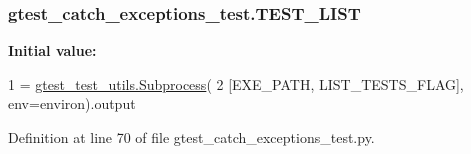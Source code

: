 \subsubsection[{\texorpdfstring{T\+E\+S\+T\+\_\+\+L\+I\+ST}{TEST_LIST}}]{\setlength{\rightskip}{0pt plus 5cm}gtest\+\_\+catch\+\_\+exceptions\+\_\+test.\+T\+E\+S\+T\+\_\+\+L\+I\+ST}\hypertarget{namespacegtest__catch__exceptions__test_ac0cf90f54624335d1765e85cf6a74e21}{}\label{namespacegtest__catch__exceptions__test_ac0cf90f54624335d1765e85cf6a74e21}
{\bfseries Initial value\+:}
\begin{DoxyCode}
1 = \hyperlink{classgtest__test__utils_1_1_subprocess}{gtest\_test\_utils.Subprocess}(
2     [EXE\_PATH, LIST\_TESTS\_FLAG], env=environ).output
\end{DoxyCode}


Definition at line 70 of file gtest\+\_\+catch\+\_\+exceptions\+\_\+test.\+py.


